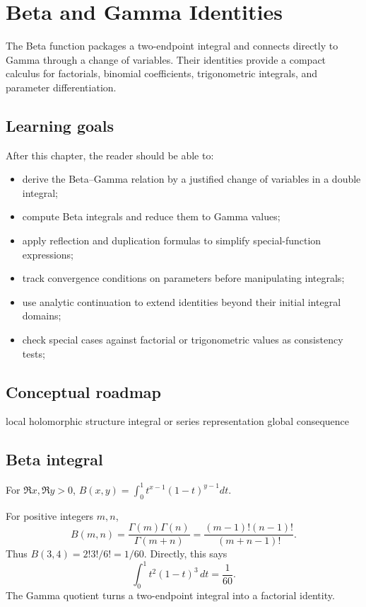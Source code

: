 \chapter{Beta and Gamma Identities}
\label{ch:iv20}

The Beta function packages a two-endpoint integral and connects directly to Gamma through a change of variables. Their identities provide a compact calculus for factorials, binomial coefficients, trigonometric integrals, and parameter differentiation.

\section*{Learning goals}
After this chapter, the reader should be able to:
\begin{itemize}
\item derive the Beta--Gamma relation by a justified change of variables in a double integral;
\item compute Beta integrals and reduce them to Gamma values;
\item apply reflection and duplication formulas to simplify special-function expressions;
\item track convergence conditions on parameters before manipulating integrals;
\item use analytic continuation to extend identities beyond their initial integral domains;
\item check special cases against factorial or trigonometric values as consistency tests;
\end{itemize}
\section*{Conceptual roadmap}
\volroadmap
  {local holomorphic structure}
  {integral or series representation}
  {global consequence}

\section{Beta integral}
For $\Re x,\Re y>0$, $B(x,y)=\int_0^1 t^{x-1}(1-t)^{y-1}dt$.

\begin{example}\label{ex:iv20-expand-01}
For positive integers \(m,n\),
\[
B(m,n)=\frac{\Gamma(m)\Gamma(n)}{\Gamma(m+n)}
=\frac{(m-1)!(n-1)!}{(m+n-1)!}.
\]
Thus \(B(3,4)=2!3!/6!=1/60\). Directly, this says
\[
\int_0^1 t^2(1-t)^3\,dt=\frac1{60}.
\]
The Gamma quotient turns a two-endpoint integral into a factorial identity.
\end{example}
